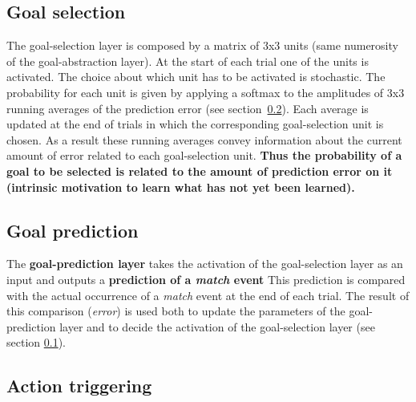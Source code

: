\documentclass[11pt]{article}
\begin{document}
\subsection{Goal selection}

\label{sec:selection}

The goal-selection layer is composed by a matrix of 3x3 units (same numerosity
of the goal-abstraction layer). At the start of each trial one of the units is
activated. The choice about which unit has to be activated is stochastic.  The
probability for each unit is given by applying a softmax to the amplitudes of
3x3 running averages of the prediction error (see
section~\ref{sec:prediction}). Each average is updated at the end of trials in
which the corresponding goal-selection unit is chosen. As a result these
running averages convey information about the current amount of error related
to each goal-selection unit. \textbf{Thus the probability of a goal to be
    selected is related to the amount of prediction error on it (intrinsic
motivation to learn what has not yet been learned).}

\subsection{Goal prediction}

\label{sec:prediction}

The \textbf{goal-prediction layer} takes the activation of the goal-selection
layer as an input and  outputs a \textbf{prediction of a \emph{match} event}
This prediction is compared with the actual occurrence of a \emph{match} event
at the end of each trial.  The result of this comparison (\emph{error}) is used
both to update the parameters of the goal-prediction layer and to decide the
activation of the goal-selection layer (see section \ref{sec:selection}).


\subsection{Action triggering}
\end{document}
